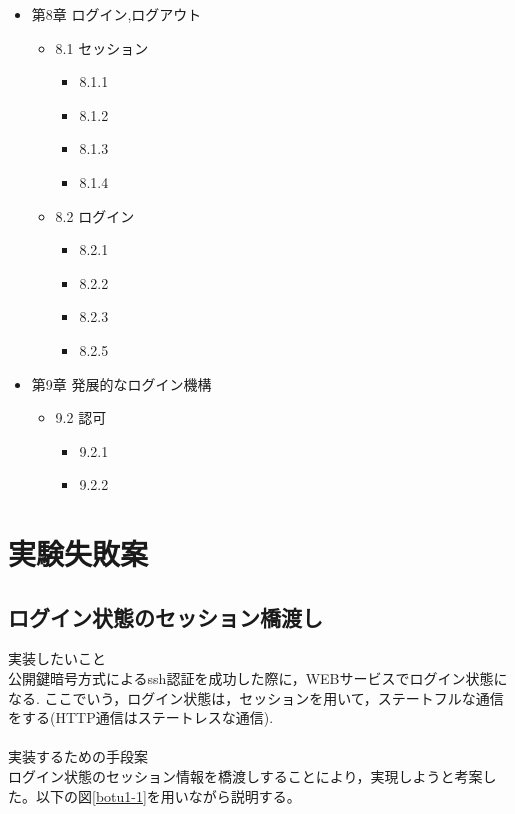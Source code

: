 \begin{itemize}
    \item 第8章 ログイン,ログアウト
    \begin{itemize}
        \item 8.1 セッション
        \begin{itemize}
            \item 8.1.1
            \item 8.1.2
            \item 8.1.3
            \item 8.1.4
        \end{itemize}
        \item 8.2 ログイン
        \begin{itemize}
            \item 8.2.1
            \item 8.2.2
            \item 8.2.3
            \item 8.2.5
        \end{itemize}
    \end{itemize}

    \item 第9章 発展的なログイン機構
    \begin{itemize}
        \item 9.2 認可
        \begin{itemize}
            \item 9.2.1
            \item 9.2.2
        \end{itemize}

    \end{itemize}


\end{itemize}



\section{実験失敗案}
\subsection{ログイン状態のセッション橋渡し}
\noindent 実装したいこと\\
公開鍵暗号方式によるssh認証を成功した際に，WEBサービスでログイン状態になる.
ここでいう，ログイン状態は，セッションを用いて，ステートフルな通信をする(HTTP通信はステートレスな通信).
\\\\
\noindent 実装するための手段案\\
ログイン状態のセッション情報を橋渡しすることにより，実現しようと考案した。以下の図\ref{botu1-1}を用いながら説明する。

